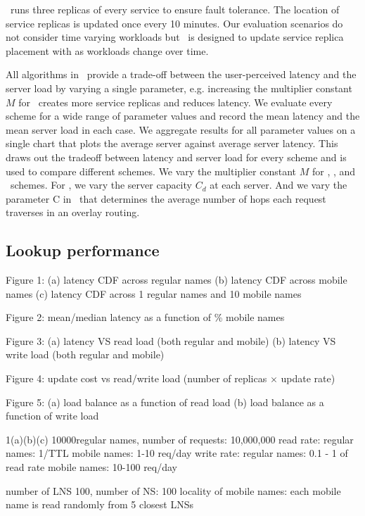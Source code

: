 \auspice\ runs three replicas of every service to ensure fault tolerance. 
The location of service replicas is updated once every 10 minutes.
Our evaluation scenarios do not consider time varying workloads but \auspice\  is designed to update service replica placement with as workloads change over time.

All algorithms in \auspice\ provide a trade-off between the user-perceived latency  and the server load by varying a single parameter, 
e.g. increasing the multiplier constant $M$ for \locaware\ creates more service replicas and reduces latency. 
We evaluate every scheme  for a wide range of parameter values and record the mean latency and the mean server load in each case.
We aggregate results for all parameter values on a single chart that plots the average server against average server latency.
This draws out the tradeoff between latency and server load for every scheme and is used to  compare different schemes.
We vary the multiplier constant $M$ for \locaware, \kmedoids, and \uniform\ schemes.
For \opt, we vary the server capacity $C_d$   at each server. 
And we vary the parameter C in  \codons\ that determines the average number of hops each request traverses in an overlay routing.

\subsection{Lookup performance}

Figure 1: (a) latency CDF across regular names
(b) latency CDF across mobile names
(c) latency CDF across 1 regular names and 10 mobile names

Figure 2: mean/median latency as  a function of \% mobile names

Figure 3: (a) latency VS read load (both regular and mobile)
(b) latency VS write load (both regular and mobile)

Figure 4: update cost vs  read/write load (number of replicas $\times$ update rate)

Figure 5: (a) load balance as a function of read load
(b) load balance as a function of write load

1(a)(b)(c) 10000regular names, number of requests: 10,000,000
read rate: regular names: 1/TTL
mobile names: 1-10 req/day
write rate: regular names: 0.1 - 1 of read rate
mobile names: 10-100 req/day

number of LNS 100, number of NS: 100
locality of mobile names: each mobile name is read randomly from 5 closest LNSs
 
